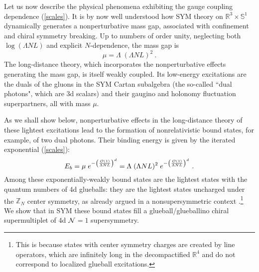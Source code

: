 \documentclass[11pt]{article}
\def\R{{\mathbb R}}
\def\S{{\mathbb S}}
\def\Z{{\mathbb Z}}
\begin{document}
Let us now describe the physical phenomena exhibiting the gauge coupling dependence (\ref{scales}). It is by now well understood how SYM theory on $\R^3 \times \S^1$  dynamically generates a nonperturbative mass gap, associated with confinement and chiral symmetry breaking. Up to numbers of order unity, neglecting both $\log(\Lambda N L)$ and explicit $N$-dependence, the mass gap is 
\begin{equation}
\label{massgap1}
\mu = \Lambda \;(\Lambda NL)^2~.
\end{equation} 
The long-distance theory, which incorporates the nonperturbative effects generating the mass gap, is itself weakly coupled. Its low-energy excitations are the duals of the gluons in the SYM Cartan subalgebra (the so-called ``dual photons", which are 3d scalars) and their gaugino and holonomy fluctuation superpartners, all with mass  $\mu$. 

As we shall show below, nonperturbative effects in the long-distance theory of these lightest excitations lead to the formation of nonrelativistic bound states, for example, of two dual photons. Their binding energy is given by the iterated exponential  (\ref{scales}):
 \begin{equation}
 \label{massgap2}
 E_b = \mu \; e^{-  \left({{\cal{O}}(1) \over \Lambda N L}\right)^d} = \Lambda \;(\Lambda NL)^2 \;e^{-  \left({{\cal{O}}(1)\over \Lambda N L}\right)^d}~.
 \end{equation}
Among these exponentially-weakly bound states are the lightest states with the quantum numbers of 4d glueballs: they are the lightest states uncharged under the $\Z_N$ center symmetry, as already argued in a nonsupersymmetric context  \cite{Aitken:2017ayq}.\footnote{This is because states with center symmetry charges are created by line operators, which are  infinitely long in the decompactified $\R^4$ and do not correspond to localized glueball excitations.} We show that in SYM these bound states fill a  glueball/glueballino chiral supermultiplet of 4d ${\cal{N}}$$=$$1$ supersymmetry. 
\end{document}
